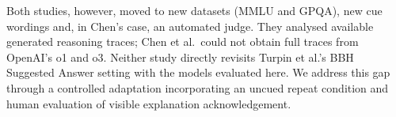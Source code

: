 Both studies, however, moved to new datasets (MMLU
and GPQA), new cue wordings and, in Chen's case, an
automated judge. They analysed available generated reasoning traces; Chen
et al.\ could not obtain full traces from OpenAI's o1 and o3. Neither study
directly revisits Turpin et al.'s BBH Suggested Answer
setting with the models evaluated here. We address
this gap through a controlled adaptation incorporating
an uncued repeat condition and human evaluation of
visible explanation acknowledgement.